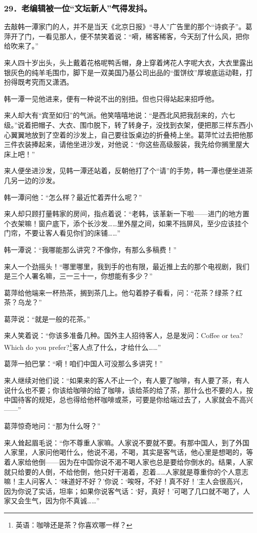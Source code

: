 \subsubsection*{29．老编辑被一位“文坛新人”气得发抖。}
\par 去敲韩一潭家门的人，并不是当天《北京日报》“寻人”广告里的那个“诗疯子”。葛萍开了门，一看见那人，便不禁笑着说：“嗬，稀客稀客，今天刮了什么风，把你给吹来了。”
\par 来人四十岁出头，头上戴着花格呢鸭舌帽，身上穿着烤花人字呢大衣，大衣里露出银灰色的纯羊毛围巾，脚下是一双美国乃基公司出品的“蛋饼纹”厚坡底运动鞋，打扮得既考究而又潇洒。
\par 韩一潭一见他进来，便有一种说不出的别扭。但也只得站起来招呼他。
\par 来人却大有“宾至如归”的气派。他笑嘻嘻地说：“是西北风把我刮来的，六七级。”说着把帽子、大衣、围巾脱下，转了转身子，没找到衣架，便把那三样东西小心翼翼地放到了空着的沙发上，自己要往饭桌边的折叠椅上坐。葛萍忙过去把他那三件衣装捧起来，请他坐进沙发，对他说：“你这些高级服装，我先给你搁里屋大床上吧！”
\par 来人便坐进沙发，见韩一潭还站着，反朝他打了个“请”的手势，韩一潭也便坐进茶几另一边的沙发。
\par 韩一潭问他：“怎么样？最近忙着弄什么呢？”
\par 来人却只顾打量韩家的房间，指点着说：“老韩，该革新一下啦——进门的地方置个衣架嘛！窗户底下，添个长沙发……里外屋之间，如果不挡屏风，至少应该挂个门帘，不要让客人看见你们的床铺……”
\par 韩一潭说：“我哪能那么讲究？不像你，有那么多稿费！”
\par 来人一个劲摇头！“哪里哪里，我到手的也有限，最近推上去的那个电视剧，我们是三个人署名嘛，三一三十一，你想能有多少？”
\par 葛萍给他端来一杯热茶，搁到茶几上。他勾着脖子看看，问：“花茶？绿茶？红茶？乌龙？”
\par 葛萍说：“就是一般的花茶。”
\par 来人笑着说：“你该多准备几种。国外主人招待客人，总是发问：Coffee or tea? Which do you prefer?\footnote{英语：咖啡还是茶？你喜欢哪一样？}客人点了什么，才给什么……”
\par 葛萍一拍巴掌：“嗬！咱们中国人可没那么多讲究！”
\par 来人继续对他们说：“如果来的客人不止一个，有人要了咖啡，有人要了茶，有人说什么也不要；你该给咖啡的给了咖啡，该给茶的给了茶，那什么也不要的人，按中国待客的规矩，总也得给他杯咖啡或茶，可要是你给端过去了，人家就会不高兴——”
\par 葛萍惊奇地问：“那为什么呀？”
\par 来人耸起眉毛说：“你不尊重人家嘛。人家说不要就不要。有那中国人，到了外国人家里，人家问他喝什么，他说不渴，不喝，其实是客气话，他心里是想喝的，等着人家给他倒——因为在中国你说不渴不喝人家也总是要给你倒水的。结果，人家就只给要的人倒，不给他倒，他只好干渴着，忍着……人家就是尊重你的个人意志嘛！主人问客人：‘味道好不好？’你说：‘唉呀，不好！真不好！’主人会很高兴，因为你说了实话，坦率；如果你说客气话：‘好，真好！’可喝了几口就不喝了，人家又会生气，因为你不真诚……”
